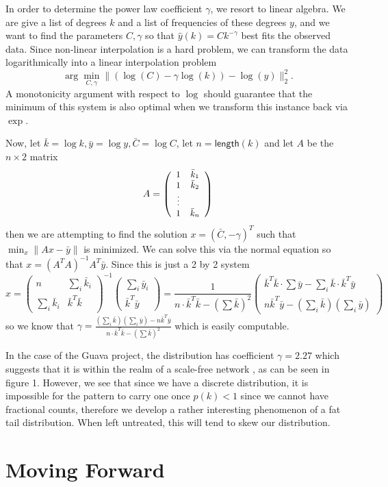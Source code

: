 \documentclass[11pt,a4paper]{article}
\newcommand{\pa}[1]{\left(#1\right)}
\newcommand{\g}[1]{\textsf{#1}}
\newcommand{\arr}[1]{\begin{array}{cccccccccc} #1\end{array}}
\newcommand{\mat}[1]{\left(\arr{#1}\right)}
\begin{document}
In order to determine the power law coefficient $\gamma$, we resort to linear
algebra. We are give a list of degrees $k$ and a list of frequencies of these 
degrees $y$, and we want to find the parameters $C,\gamma$ so that 
$\hat y(k) = Ck^{-\gamma}$ best fits the observed data. Since non-linear 
interpolation is a hard problem, we can transform the data logarithmically into
a linear interpolation problem
$$
\arg\min_{C,\gamma} \|(\log(C) - \gamma \log(k)) - \log(y)\|_2^2.
$$
A monotonicity argument with respect to $\log$ should guarantee that the
minimum of this system is also optimal when we transform this instance back
via $\exp$.

Now, let $\bar k = \log k, \bar y = \log y, \bar C = \log C$, let $n = \g{length}(k)$
 and let $A$ be the $n \times 2$ matrix 
 $$\small A = \mat{1 & \bar k_1 \\ 1 & \bar k_2 \\ \vdots \\ 1 & \bar k_n}$$ 
then we are attempting to find the solution $x = \pa{\bar C, -\gamma}^T$ such 
that $\min_x \|Ax - \bar y\|$ is minimized. We can solve this via the normal equation 
\cite{linalg} so that  $x = (A^TA)^{-1}A^T\bar y$. Since this is just a 2 by 2 system
$$
x = \mat{n & \sum_i \bar k_i \\ \sum_i \bar k_i & \bar k^T\bar k}^{-1} 
\mat{\sum_i \bar y_i \\ \bar k^T\bar y} 
= \frac{1}{n\cdot \bar k^T\bar k - \pa{\sum \bar k}^2} 
\mat{\bar k^T \bar k \cdot \sum \bar y - \sum_i \bar k \cdot \bar k^T\bar y \\ 
n \bar k^T \bar y - \pa{\sum_i \bar k}\pa{\sum_i \bar y}}
$$
so we know that $\gamma = 
\frac{\pa{\sum_i \bar k}\pa{\sum_i \bar y}- 
n \bar k^T \bar y}{n\cdot \bar k^T\bar k - \pa{\sum \bar k}^2}$ which is easily
computable. 

In the case of the Guava project, the distribution has coefficient $\gamma = 2.27$
which suggests that it is within the realm of a scale-free network \cite{CLASS}, 
as can be seen in 
figure 1. However, we see that since we have a discrete distribution, it is impossible
for the pattern to carry one once $p(k) < 1$ since we cannot have fractional counts,
therefore we develop a rather interesting phenomenon of a fat tail distribution.
When left untreated, this will tend to skew our distribution.

\section*{Moving Forward}

\medskip

\printbibliography[title={References}]
\end{document}
